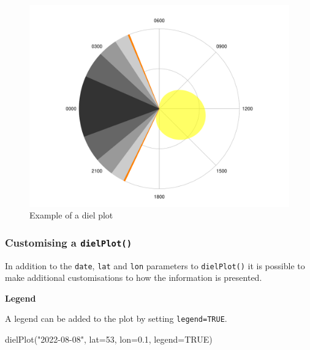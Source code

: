 \documentclass[
]{book}
\newenvironment{Shaded}{\begin{snugshade}}{\end{snugshade}}
\newcommand{\AttributeTok}[1]{\textcolor[rgb]{0.77,0.63,0.00}{#1}}
\newcommand{\ConstantTok}[1]{\textcolor[rgb]{0.00,0.00,0.00}{#1}}
\newcommand{\DecValTok}[1]{\textcolor[rgb]{0.00,0.00,0.81}{#1}}
\newcommand{\FloatTok}[1]{\textcolor[rgb]{0.00,0.00,0.81}{#1}}
\newcommand{\FunctionTok}[1]{\textcolor[rgb]{0.00,0.00,0.00}{#1}}
\newcommand{\NormalTok}[1]{#1}
\newcommand{\StringTok}[1]{\textcolor[rgb]{0.31,0.60,0.02}{#1}}
\begin{document}
\begin{figure}

{\centering \includegraphics[width=0.9\linewidth]{_main_files/figure-latex/diel-plot-1-1} 

}

\caption{Example of a diel plot}\label{fig:diel-plot-1}
\end{figure}

\hypertarget{customising-a-dielplot}{%
\subsubsection{\texorpdfstring{Customising a \texttt{dielPlot()}}{Customising a dielPlot()}}\label{customising-a-dielplot}}

In addition to the \texttt{date}, \texttt{lat} and \texttt{lon} parameters to \texttt{dielPlot()} it is possible to make additional customisations to how the information is presented.

\textbf{Legend}

A legend can be added to the plot by setting \texttt{legend=TRUE}.

\begin{Shaded}
\begin{Highlighting}[]
\FunctionTok{dielPlot}\NormalTok{(}\StringTok{"2022{-}08{-}08"}\NormalTok{, }\AttributeTok{lat=}\DecValTok{53}\NormalTok{, }\AttributeTok{lon=}\FloatTok{0.1}\NormalTok{, }\AttributeTok{legend=}\ConstantTok{TRUE}\NormalTok{)}
\end{Highlighting}
\end{Shaded}
\end{document}
